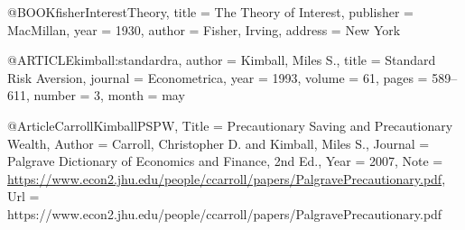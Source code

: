 @BOOK{fisherInterestTheory,
  title =	 {The Theory of Interest},
  publisher =	 {MacMillan},
  year =	 1930,
  author =	 {Fisher, Irving},
  address =	 {New York}
}


@ARTICLE{kimball:standardra,
  author =	 {Kimball, Miles S.},
  title =	 {Standard Risk Aversion},
  journal =	 {Econometrica},
  year =	 1993,
  volume =	 61,
  pages =	 {589--611},
  number =	 3,
  month =	 may
}

@Article{CarrollKimballPSPW,
  Title =	 {Precautionary Saving and Precautionary Wealth},
  Author =	 {Carroll, Christopher D. and Kimball, Miles S.},
  Journal =	 {Palgrave Dictionary of Economics and Finance, 2nd Ed.},
  Year =	 2007,
  Note =	 {\url{https://www.econ2.jhu.edu/people/ccarroll/papers/PalgravePrecautionary.pdf}},
  Url =		 {https://www.econ2.jhu.edu/people/ccarroll/papers/PalgravePrecautionary.pdf}
}


